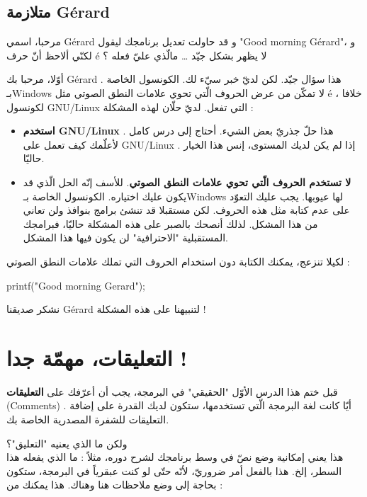 \subsection{متلازمة \textenglish{Gérard}}

\begin{question}
  مرحبا، اسمي
\textenglish{Gérard}
و قد حاولت تعديل برنامجك ليقول
"\textenglish{Good morning Gérard}"،
و لكنّي ألاحظ أنّ حرف
\textenglish{é}
 لا يظهر بشكل جيّد
\dots
 مالّذي عليّ فعله ؟
\end{question}

أوّلا، مرحبا بك
\textenglish{Gérard}
. هذا سؤال جيّد. لكن لديّ خبر سيّء لك. الكونسول الخاصة بـ\textenglish{Windows}
لا تمكّن من عرض الحروف الّتي تحوي علامات النطق الصوتي مثل
\textenglish{é}
، خلافا لكونسول
\textenglish{GNU/Linux}
التي تفعل. لديّ حلّان لهذه المشكلة :

\begin{itemize}
  \item \textbf{استخدم
\textenglish{GNU/Linux}}
. هذا حلّ جذريّ بعض الشيء. أحتاج إلى درس كامل لأعلّمك كيف تعمل على
\textenglish{GNU/Linux}
. إذا لم يكن لديك المستوى، إنس هذا الخيار حاليّا.
  \item \textbf{لا تستخدم الحروف الّتي تحوي علامات النطق الصوتي}.
للأسف إنّه الحل الّذي قد يكون عليك اختياره. الكونسول الخاصة بـ\textenglish{Windows}
لها عيوبها. يجب عليك التعوّد على عدم كتابة مثل هذه الحروف. لكن مستقبلا قد تنشئ برامج بنوافذ ولن تعاني من هذا المشكل. لذلك أنصحك بالصبر على هذه المشكلة حاليّا، فبرامجك المستقبلية "الاحترافية" لن يكون فيها هذا المشكل.
\end{itemize}

لكيلا تنزعج، يمكنك الكتابة دون استخدام الحروف التي تملك علامات النطق الصوتي :

\begin{Csource}
printf("Good morning Gerard\n");
\end{Csource}

نشكر صديقنا
\textenglish{Gérard}
لتنبيهنا على هذه المشكلة !

\section{التعليقات، مهمّة جدا !}
قبل ختم هذا الدرس الأوّل "الحقيقي" في البرمجة، يجب أن أعرّفك على
\textbf{التعليقات}
(\textenglish{Comments})
. أيّا كانت لغة البرمجة الّتي تستخدمها، ستكون لديك القدرة على إضافة التعليقات للشفرة المصدرية الخاصة بك.

ولكن ما الذي يعنيه "التعليق"؟\\
هذا يعني إمكانية وضع نصّ في وسط برنامجك لشرح دوره، مثلاً : ما الذي يفعله هذا السطر، إلخ. هذا بالفعل أمر ضروريّ، لأنّه حتّى لو كنت عبقرياً في البرمجة، ستكون بحاجة إلى وضع ملاحظات هنا وهناك. هذا يمكنك من :

